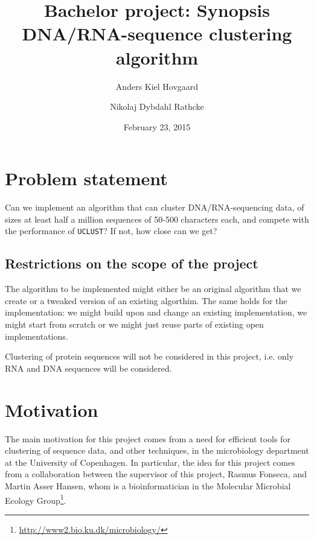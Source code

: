 \documentclass[12pt,a4paper]{article}
\title{Bachelor project: Synopsis \\
       \vspace{2mm}
       {\LARGE DNA/RNA-sequence clustering algorithm}} %
\author{Anders Kiel Hovgaard \and Nikolaj Dybdahl Rathcke}
\date{February 23, 2015}
\begin{document}
\maketitle
\thispagestyle{fancy}

\section{Problem statement}
Can we implement an algorithm that can cluster DNA/RNA-sequencing data, of
sizes at least half a million sequences of 50-500 characters each, and compete
with the performance of \texttt{UCLUST}? If not, how close can we get?



\subsection{Restrictions on the scope of the project}
The algorithm to be implemented might either be an original algorithm that we
create or a tweaked version of an existing algorthim. The same holds for the
implementation: we might build upon and change an existing implementation, we
might start from scratch or we might just reuse parts of existing open
implementations. %

Clustering of protein sequences will not be considered in this project, i.e.
only RNA and DNA sequences will be considered.


\section{Motivation}
The main motivation for this project comes from a need for efficient tools for
clustering of sequence data, and other techniques, in the microbiology
department at the University of Copenhagen. In particular, the idea for this
project comes from a collaboration between the supervisor of this project,
Rasmus Fonseca, and Martin Asser Hansen, whom is a bioinformatician in the
Molecular Microbial Ecology
Group\footnote{\url{http://www2.bio.ku.dk/microbiology/}}.
\end{document}

